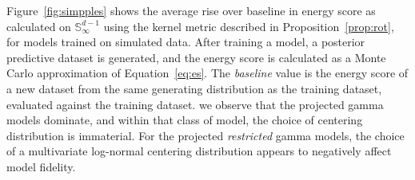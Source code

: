 Figure~\ref{fig:simpples} shows the average rise over baseline in energy score as
    calculated on $\mathbb{S}_{\infty}^{d-1}$ using the kernel metric described
    in Proposition~\ref{prop:rot}, for models trained on simulated data.  After training
    a model, a posterior predictive dataset is generated, and the energy score is
    calculated as a Monte Carlo approximation of Equation~\ref{eq:es}.
    The \emph{baseline} value is the energy score of a new dataset from the same
    generating distribution as the training dataset, evaluated against the training 
    dataset.  
    we observe that the projected gamma models dominate, and within that class
    of model, the choice of centering distribution is immaterial.  For the 
    projected \emph{restricted} gamma models, the choice of a multivariate log-normal 
    centering distribution appears to  negatively affect model 
    fidelity.  

